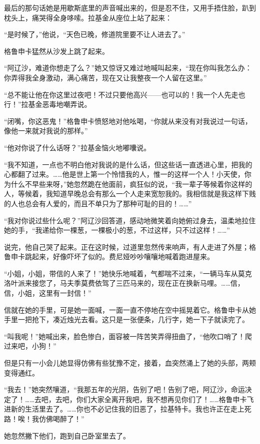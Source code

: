 \par 最后的那句话她是用歇斯底里的声音喊出来的，但是忍不住，又用手捂住脸，趴到枕头上，痛哭得全身哆嗦。拉基金从座位上站了起来：
\par “是时候了，”他说，“天色已晚，修道院里要不让人进去了。”
\par 格鲁申卡猛然从沙发上跳了起来。
\par “阿辽沙，难道你想走了么？”她又惊讶又难过地喊叫起来，“现在你叫我怎么办：你弄得我全身激动，满心痛苦，现在又让我整夜一个人留在这里。”
\par “总不能让他在你这里过夜吧！不过只要他高兴——也可以的！我一个人先走也行！”拉基金恶毒地嘲弄说。
\par “闭嘴，你这恶鬼！”格鲁申卡愤怒地对他吆喝，“你就从来没有对我说过一句话，像他一来就对我说的那样。”
\par “他对你说了什么话呀？”拉基金恼火地嘟囔说。
\par “我不知道，一点也不明白他对我说的是什么话，但这些话一直透进心里，把我的心都翻了过来。……他是世上第一个怜惜我的人，惟一的这样一个人！小天使，你为什么不早些来呀，”她忽然跪在他面前，疯狂似的说，“我一辈子等候着你这样的人，等候着，我知道早晚总会有那么一个人走来宽恕我的。我相信就是我这样下贱的人也总会有人爱的，而且不单只为了那种可耻的目的！……”
\par “我对你说过些什么呢？”阿辽沙回答道，感动地微笑着向她俯过身去，温柔地拉住她的手，“我递给你一棵葱，一棵极小的葱，不过这样，只不过这样！……”
\par 说完，他自己哭了起来。正在这时候，过道里忽然传来响声，有人走进了外屋；格鲁申卡跳起来，好像吓坏了似的。费尼娅吵吵嚷嚷地喊着跑进屋来。
\par “小姐，小姐，带信的人来了！”她快乐地喊着，气都喘不过来，“一辆马车从莫克洛叶派来接您了，马夫季莫费依驾了三匹马来的，现在正在换新马哩。……信，信，小姐，这里有一封信！”
\par 信就在她的手里，可是她一面喊，一面一直不停地在空中摇晃着它。格鲁申卡从她手里一把抢下，凑近烛光去看。这只是一张便条，几行字，她一下子就读完了。
\par “叫我呢！”她喊出来，脸色惨白，面容被一阵苦笑弄得扭曲了，“他吹口哨了！爬过来吧，小狗！”
\par 但是只有一小会儿她显得仿佛有些犹豫不定，接着，血突然涌上了她的头部，两颊变得通红。
\par “我去！”她突然嚷道，“我那五年的光阴，告别了吧！告别了吧，阿辽沙，命运决定了！……去吧，去吧，你们大家全离开我吧，我不想再见你们了！……格鲁申卡飞进新的生活里去了。……你也不必记住我的旧恶了，拉基特卡。我也许正在走上死路！唉！我仿佛喝醉了！”
\par 她忽然撇下他们，跑到自己卧室里去了。
